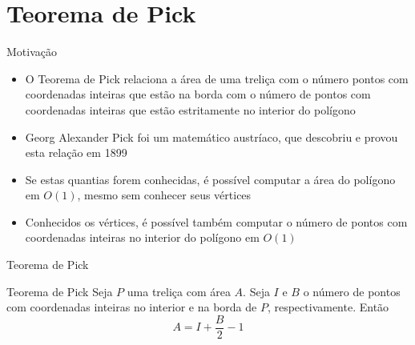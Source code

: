 \section{Teorema de Pick}

\begin{frame}[fragile]{Motivação}

    \begin{itemize}
        \item O Teorema de Pick relaciona a área de uma treliça com o número pontos com
            coordenadas inteiras que estão na borda com o número de pontos com coordenadas 
            inteiras que estão estritamente no interior do polígono

        \item Georg Alexander Pick foi um matemático austríaco, que descobriu e provou esta
            relação em 1899

        \item Se estas quantias forem conhecidas, é possível computar a área do polígono em
            $O(1)$, mesmo sem conhecer seus vértices

        \item Conhecidos os vértices, é possível também computar o número de pontos com 
            coordenadas inteiras no interior do polígono em $O(1)$
    \end{itemize}
    
\end{frame}

\begin{frame}[fragile]{Teorema de Pick}

    \begin{block}{Teorema de Pick}
        Seja $P$ uma treliça com área $A$. Seja $I$ e $B$ o número de pontos com coordenadas
            inteiras no interior e na borda de $P$, respectivamente. Então
            \[
                A = I + \frac{B}{2} - 1
            \]
    \end{block}

\end{frame}

